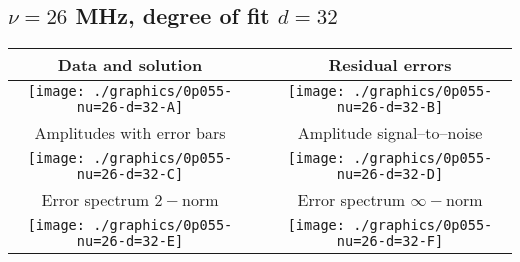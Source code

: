 

% 

\clearpage{}
\break{}

\subsection{$\nu = 26$ MHz, degree of fit $d = 32$}

\begin{table}[h]
    \begin{center}
        \begin{tabular}{ccc}
            Data and solution & \quad & Residual errors \\\hline
            \texttt{[image: ./graphics/0p055-nu=26-d=32-A]} &&
            \texttt{[image: ./graphics/0p055-nu=26-d=32-B]} \\[15pt]
            Amplitudes with error bars && Amplitude signal--to--noise \\\hline
            \texttt{[image: ./graphics/0p055-nu=26-d=32-C]} &&
            \texttt{[image: ./graphics/0p055-nu=26-d=32-D]} \\[15pt]
            Error spectrum $2-$norm && Error spectrum $\infty-$norm \\\hline
            \texttt{[image: ./graphics/0p055-nu=26-d=32-E]} &&
            \texttt{[image: ./graphics/0p055-nu=26-d=32-F]} \\[15pt]
        \end{tabular}
    \end{center}
\label{fig:elev=55, nu=26}
\end{table}



\endinput
